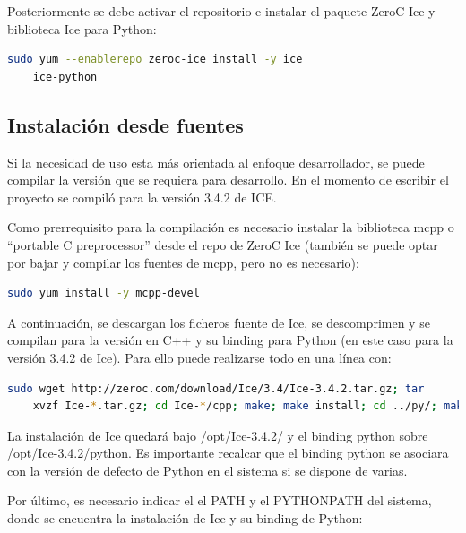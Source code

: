     Posteriormente se debe activar el repositorio e instalar el paquete ZeroC
    Ice y biblioteca Ice para Python:

    \begin{lstlisting}[language={bash}, texcl=false, caption={Instalación Zero
    C ICE desde repositorios}] sudo yum --enablerepo zeroc-ice install -y ice
    ice-python
    \end{lstlisting}

    \newpage
    
    \subsection{Instalación desde fuentes}
 
    Si la necesidad de uso esta más orientada al enfoque desarrollador, se puede
    compilar la versión que se requiera para desarrollo. En el momento de
    escribir el proyecto se compiló para la versión 3.4.2 de ICE.

    Como prerrequisito para la compilación es necesario instalar la biblioteca
    mcpp o ``portable C preprocessor'' desde el repo de ZeroC Ice (también
    se puede optar por bajar y compilar los fuentes de mcpp, pero no es
    necesario):

    \begin{lstlisting}[language={bash}, texcl=false, caption={Instalación mcpp}]
    sudo yum install -y mcpp-devel
    \end{lstlisting}

    A continuación, se descargan los ficheros fuente de Ice, se descomprimen y
    se compilan para la versión en C++ y su binding para Python (en este 
    caso para la versión 3.4.2 de Ice). Para ello puede realizarse todo en una
    línea con:
    
    \begin{lstlisting}[language={bash}, texcl=false, caption={Instalación Zero
    C ICE}] sudo wget http://zeroc.com/download/Ice/3.4/Ice-3.4.2.tar.gz; tar
    xvzf Ice-*.tar.gz; cd Ice-*/cpp; make; make install; cd ../py/; make;make install
    \end{lstlisting}

    La instalación de Ice quedará bajo /opt/Ice-3.4.2/ y el binding python sobre
    /opt/Ice-3.4.2/python. Es importante recalcar que el binding python se
    asociara con la versión de defecto de Python en el sistema si se dispone de
    varias.

    Por último, es necesario indicar el el PATH y el PYTHONPATH del sistema,
    donde se encuentra la instalación de Ice y su binding de Python:

